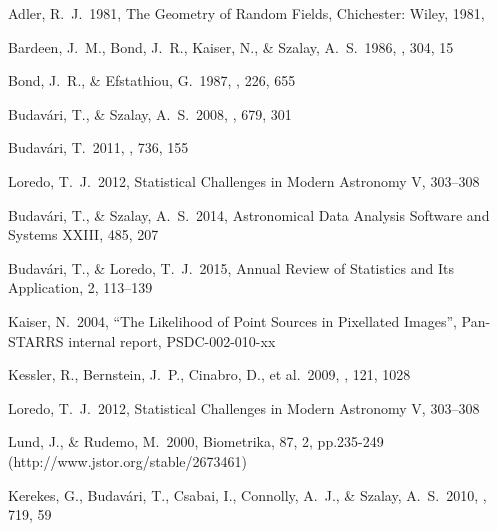 \documentclass[twocolumn]{emulateapj}
\begin{document}
\begin{thebibliography}{}

 Adler, R.~J.\ 1981, The Geometry of Random Fields, Chichester: Wiley, 1981,  

 Bardeen, J.~M., Bond, J.~R., Kaiser, N., \& Szalay, A.~S.\ 1986, \apj, 304, 15 

 Bond, J.~R., \& Efstathiou, G.\ 1987, \mnras, 226, 655

 Budav{\'a}ri, T., \& Szalay, A.~S.\ 2008, \apj, 679, 301

 Budav{\'a}ri, T.\ 2011, 
\apj, 736, 155 

 Loredo, T.~J.\ 2012, {Statistical {Challenges} in {Modern} {Astronomy} {V}}, 303--308

 Budav{\'a}ri, T., \& Szalay, A.~S.\ 2014, Astronomical Data Analysis Software and Systems XXIII, 485,
207

 Budav{\'a}ri, T., \& Loredo, T.~J.\ 2015, Annual Review of Statistics and Its Application, 2, 113--139



 Kaiser, N.\ 2004, ``The Likelihood of Point Sources in Pixellated Images'', Pan-STARRS internal report, PSDC-002-010-xx

 Kessler, R., Bernstein, J.~P., Cinabro, D., et al.\ 2009, \pasp, 121, 1028 

 Loredo, T.~J.\ 2012, {Statistical {Challenges} in {Modern} {Astronomy} {V}}, 303--308

 Lund, J., \& Rudemo, M.\ 2000, Biometrika, 87, 2, pp.235-249 (http://www.jstor.org/stable/2673461)

 Kerekes, G., Budav{\'a}ri, T., Csabai, I., Connolly, A.~J., \& Szalay, A.~S.\ 2010, \apj, 719, 59 


\end{thebibliography}
\end{document}
